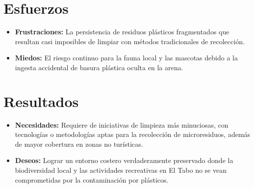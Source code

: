 \documentclass[12pt,letterpaper]{article}
\begin{document}
\section*{Esfuerzos}
\begin{itemize}[leftmargin=*]
	\item \textbf{Frustraciones:} La persistencia de residuos plásticos fragmentados que resultan casi imposibles de limpiar con métodos tradicionales de recolección.
	\item \textbf{Miedos:} El riesgo continuo para la fauna local y las mascotas debido a la ingesta accidental de basura plástica oculta en la arena.
\end{itemize}

\section*{Resultados}
\begin{itemize}[leftmargin=*]
	\item \textbf{Necesidades:} Requiere de iniciativas de limpieza más minuciosas, con tecnologías o metodologías aptas para la recolección de microresiduos, además de mayor cobertura en zonas no turísticas.
	\item \textbf{Deseos:} Lograr un entorno costero verdaderamente preservado donde la biodiversidad local y las actividades recreativas en El Tabo no se vean comprometidas por la contaminación por plásticos.
\end{itemize}
\end{document}
